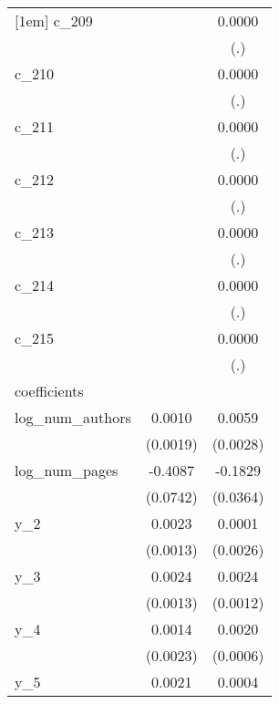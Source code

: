 {\begin{tabular}{l*{2}{c}}
[1em]
c\_209       &                    &      0.0000        \\
            &                    &         (.)        \\
[1em]
c\_210       &                    &      0.0000        \\
            &                    &         (.)        \\
[1em]
c\_211       &                    &      0.0000        \\
            &                    &         (.)        \\
[1em]
c\_212       &                    &      0.0000        \\
            &                    &         (.)        \\
[1em]
c\_213       &                    &      0.0000        \\
            &                    &         (.)        \\
[1em]
c\_214       &                    &      0.0000        \\
            &                    &         (.)        \\
[1em]
c\_215       &                    &      0.0000        \\
            &                    &         (.)        \\
\hline
coefficients&                    &                    \\
log\_num\_authors&      0.0010        &      0.0059\sym{**}\\
            &    (0.0019)        &    (0.0028)        \\
[1em]
log\_num\_pages&     -0.4087\sym{**}&     -0.1829\sym{**}\\
            &    (0.0742)        &    (0.0364)        \\
[1em]
y\_2         &      0.0023\sym{*} &      0.0001        \\
            &    (0.0013)        &    (0.0026)        \\
[1em]
y\_3         &      0.0024\sym{*} &      0.0024\sym{**}\\
            &    (0.0013)        &    (0.0012)        \\
[1em]
y\_4         &      0.0014        &      0.0020\sym{**}\\
            &    (0.0023)        &    (0.0006)        \\
[1em]
y\_5         &      0.0021        &      0.0004        \\

\end{tabular}}
